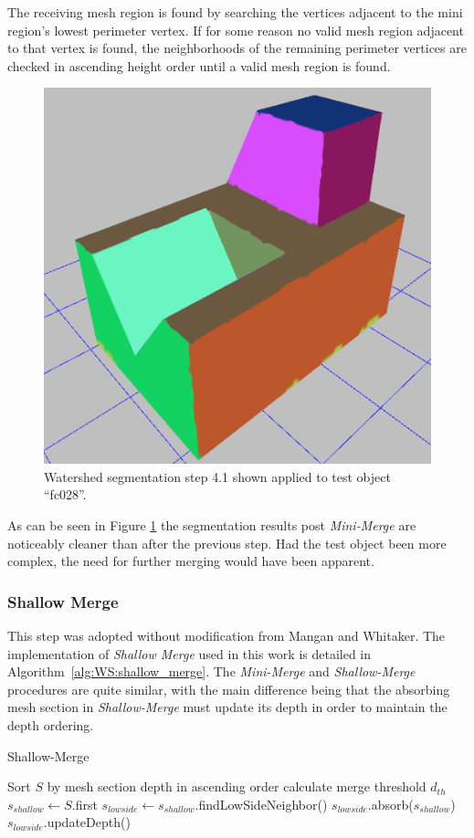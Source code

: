The receiving mesh region is found by searching the vertices adjacent to the mini region's lowest perimeter vertex.
If for some reason no valid mesh region adjacent to that vertex is found, the neighborhoods of the remaining perimeter vertices are checked in ascending height order until a valid mesh region is found.

\begin{figure}[htb]
	\centering
	\includegraphics[width=0.5\linewidth]{../resources/watershed/fc028_WS4.1.png}
\caption{
Watershed segmentation step 4.1 shown applied to test object ``fc028''.
}
	\label{fig:ws_4.1}
\end{figure}

As can be seen in Figure \ref{fig:ws_4.1} the segmentation results post \textit{Mini-Merge} are noticeably cleaner than after the previous step.
Had the test object been more complex, the need for further merging would have been apparent.

\subsubsection{Shallow Merge}
This step was adopted without modification from Mangan and Whitaker.
The implementation of \textit{Shallow Merge} used in this work is detailed in Algorithm~\ref{alg:WS:shallow_merge}.
The \textit{Mini-Merge} and \textit{Shallow-Merge} procedures are quite similar, with the main difference being that the absorbing mesh section in \textit{Shallow-Merge} must update its depth in order to maintain the depth ordering.

\begin{algorithm}[htb]
\caption{Shallow-Merge}\label{alg:WS:shallow_merge}
\begin{algorithmic}[1]
		\State Sort $S$ by mesh section depth in ascending order
		\State calculate merge threshold $d_{th}$
			\State $s_{shallow} \leftarrow S$.first
			\State $s_{lowside} \leftarrow s_{shallow}$.findLowSideNeighbor()
			\State $s_{lowside}$.absorb($s_{shallow}$)
			\State $s_{lowside}$.updateDepth()
		\EndWhile
	\EndFunction
\end{algorithmic}
\end{algorithm}

